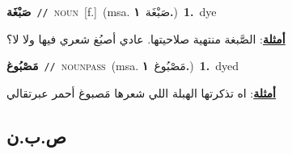 \documentclass[10pt,a4paper,twoside]{article} %
\begin{document}
\begin{multicols}{2}
{{{{{{{{{\setlength\topsep{0pt}\textbf{\foreignlanguage{arabic}{صَبْغَة}}\ {\color{gray}\texttt{//}\color{black}}\ \textsc{noun}\ [f.]\ \color{gray}(msa. \foreignlanguage{arabic}{صَبْغَة}~\foreignlanguage{arabic}{\textbf{١.}})\color{black}\ \textbf{1.}~dye\  \begin{flushright}\color{gray}\foreignlanguage{arabic}{\textbf{\underline{\foreignlanguage{arabic}{أمثلة}}}: الصَّبغة منتهية صلاحيتها. عادي أصبُغ شعري فيها ولا لا؟}\end{flushright}\color{black}} \vspace{2mm}

{\setlength\topsep{0pt}\textbf{\foreignlanguage{arabic}{مَصْبُوغ}}\ {\color{gray}\texttt{//}\color{black}}\ \textsc{noun\textunderscore pass}\ \color{gray}(msa. \foreignlanguage{arabic}{مَصْبُوغ}~\foreignlanguage{arabic}{\textbf{١.}})\color{black}\ \textbf{1.}~dyed\  \begin{flushright}\color{gray}\foreignlanguage{arabic}{\textbf{\underline{\foreignlanguage{arabic}{أمثلة}}}: اه تذكرتها الهبلة اللي شعرها مَصبوغ أحمر عبرتقالي}\end{flushright}\color{black}} \vspace{2mm}

\vspace{-3mm}
\subsection*{\color{blue}\foreignlanguage{arabic}{ص.ب.ن}\color{blue}{}} 

}}}}}}}}
\end{multicols}
\end{document}
